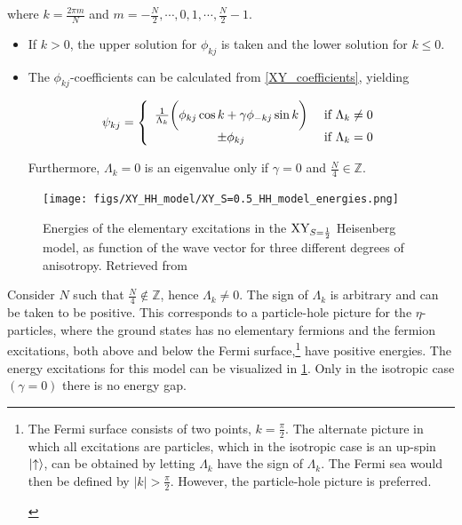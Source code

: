 \documentclass{homework}
\begin{document}
where $k = \frac{2\pi m}{N}$ and $m = -\frac{N}{2}, \cdots, 0, 1, \cdots, \frac{N}{2}-1.$

\begin{itemize}
    \item If $k>0$, the upper solution for $\phi_{kj}$ is taken and the lower solution for $k \leq 0$.
    \item The $\phi_{kj}$-coefficients can be calculated from \cref{XY_coefficients}, yielding 
    
    \begin{equation}
        \psi_{kj} = \left\{ \begin{array}{cc}
             \frac{1}{\Lambda_k} \bigg( \phi_{kj} \cos k + \gamma \phi_{-kj} \sin k\bigg) & \textnormal{ if } \Lambda_k \neq 0 \\
             \pm \phi_{kj}  & \textnormal{ if } \Lambda_k = 0 
        \end{array} \right.
        \label{XY_psi_kj_coeffs}
    \end{equation}
    
    Furthermore, $\Lambda_k = 0$ is an eigenvalue only if $\gamma = 0$ and $\frac{N}{4} \in \mathds{Z}$. \\
\end{itemize}

\begin{figure}
    \centering
    \texttt{[image: figs/XY\_HH\_model/XY\_S=0.5\_HH\_model\_energies.png]}
    \caption{Energies of the elementary excitations in the $\textnormal{XY}_{S=\frac{1}{2}}$ Heisenberg model, as function of the wave vector for three different degrees of anisotropy. Retrieved from \cite{LIEB1961407}}
    \label{fig:XY_S=0.5_HH_model_energies}
\end{figure}

Consider $N$ such that $\frac{N}{4} \notin \mathds{Z}$, hence $\Lambda_k \neq 0$. The sign of $\Lambda_k$ is arbitrary and can be taken to be positive. This corresponds to a particle-hole picture for the $\eta$-particles, where the ground states has no elementary fermions and the fermion excitations, both above and below the Fermi surface,\footnote{\begin{tcolorbox}[colback = yellow, title = Physical Context]

The Fermi surface consists of two points, $k = \frac{\pi}{2}$. The alternate picture in which all excitations are particles, which in the isotropic case is an up-spin $\ket{\uparrow}$, can be obtained by letting $\Lambda_k$ have the sign of $\Lambda_k$. The Fermi sea would then be defined by $|k| > \frac{\pi}{2}.$ However, the particle-hole picture is preferred. 

\end{tcolorbox}} have positive energies. The energy excitations for this model can be visualized in \cref{fig:XY_S=0.5_HH_model_energies}. Only in the isotropic case $(\gamma = 0)$ there is no energy gap.\\
\end{document}
